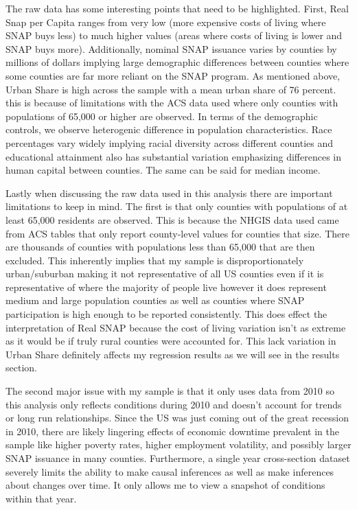 \documentclass{article}
\begin{document}
The raw data has some interesting points that need to be highlighted. First, Real Snap per Capita ranges from very low (more expensive costs of living where SNAP buys less) to much higher values (areas where costs of living is lower and SNAP buys more). Additionally, nominal SNAP issuance varies by counties by millions of dollars implying large demographic differences between counties where some counties are far more reliant on the SNAP program. As mentioned above, Urban Share is high across the sample with a mean urban share of 76 percent. this is because of limitations with the ACS data used where only counties with populations of 65,000 or higher are observed. In terms of the demographic controls, we observe heterogenic difference in population characteristics. Race percentages vary widely implying racial diversity across different counties and educational attainment also has substantial variation emphasizing differences in human capital between counties. The same can be said for median income. 

Lastly when discussing the raw data used in this analysis there are important limitations to keep in mind. The first is that only counties with populations of at least 65,000 residents are observed. This is because the NHGIS data used came from ACS tables that only report county-level values for counties that size. There are thousands of counties with populations less than 65,000 that are then excluded. This inherently implies that my sample is disproportionately urban/suburban making it not representative of all US counties even if it is representative of where the majority of people live however it does represent medium and large population counties as well as counties where SNAP participation is high enough to be reported consistently. This does effect the interpretation of Real SNAP because the cost of living variation isn't as extreme as it would be if truly rural counties were accounted for. This lack variation in Urban Share definitely affects my regression results as we will see in the results section.  

The second major issue with my sample is that it only uses data from 2010 so this analysis only reflects conditions during 2010 and doesn't account for trends or long run relationships. Since the US was just coming out of the great recession in 2010, there are likely lingering effects of economic downtime prevalent in the sample like higher poverty rates, higher employment volatility, and possibly larger SNAP issuance in many counties. Furthermore, a single year cross-section dataset severely limits the ability to make causal inferences as well as make inferences about changes over time. It only allows me to view a snapshot of conditions within that year. 
\end{document}

